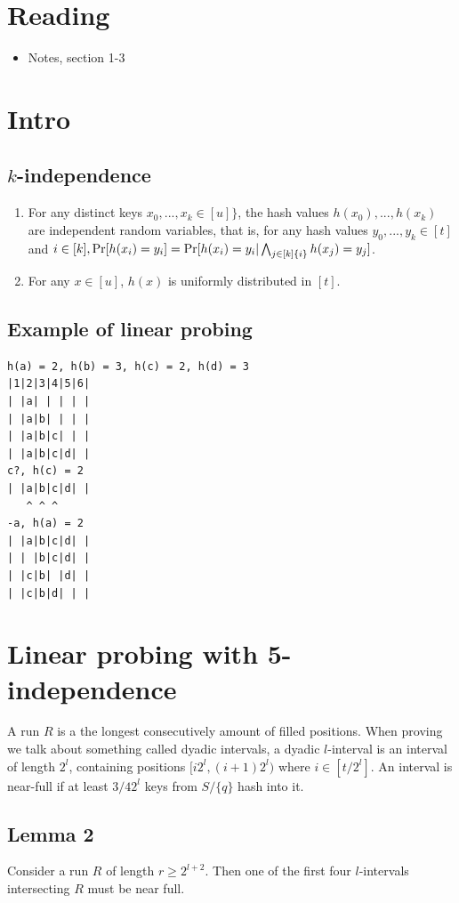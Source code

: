 \documentclass[a4paper, fleqn]{article}
\begin{document}
\section*{Reading}
\begin{itemize}
    \item Notes, section 1-3
\end{itemize}
\tableofcontents
\section{Intro}
\subsection{$k$-independence}
\begin{enumerate}
  \item For any distinct keys $x_0,...,x_k \in [u]\}$, the hash values $h(x_0),...,h(x_k)$ are independent random variables, that is, for any hash values $y_0,...,y_k \in [t]$ and $i \in [k], \Pr[h(x_i)=y_i] = \Pr[h(x_i) = y_i | \bigwedge_{j\in[k]\\\{i\}} h(x_j) = y_j]$.
  \item For any $x \in [u]$, $h(x)$ is uniformly distributed in $[t]$.
\end{enumerate}
\subsection{Example of linear probing}
\begin{verbatim}
h(a) = 2, h(b) = 3, h(c) = 2, h(d) = 3
|1|2|3|4|5|6|
| |a| | | | |
| |a|b| | | |
| |a|b|c| | |
| |a|b|c|d| |
c?, h(c) = 2
| |a|b|c|d| |
   ^ ^ ^
-a, h(a) = 2
| |a|b|c|d| |
| | |b|c|d| |
| |c|b| |d| |
| |c|b|d| | |
\end{verbatim}
\section{Linear probing with 5-independence}
A run $R$ is a the longest consecutively amount of filled positions. When proving we talk about something called dyadic intervals, a dyadic $l$-interval is an interval of length $2^l$, containing positions $[i2^l,(i+1)2^l)$ where $i \in [t/2^l]$. An interval is near-full if at least $3/4 2^l$ keys from $S/\{q\}$ hash into it.
\subsection{Lemma 2}
Consider a run $R$ of length $r \geq 2^{l+2}$. Then one of the first four $l$-intervals intersecting $R$ must be near full.
\end{document}
